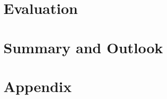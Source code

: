 \documentclass[
12pt,							%
oneside,							%
openany,							%
headsepline,						%
listof=flat,						%
numbers=noenddot					%
]{scrbook}
\begin{document}
\chapter{Evaluation}
\label{chap:evaluation}
    
    
\chapter{Summary and Outlook}
\label{chap:conclusion}
    
\newpage    
\appendix
\chapter{Appendix}
    \label{chap:appendix}
    
%
%
%
%
\cleardoublepage
{}
{}
\printbibliography[title={References}]
%
%
\end{document}

